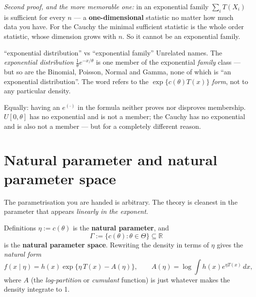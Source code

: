 \documentclass[11pt]{article}
\newcommand{\R}{\mathbb{R}}
\begin{document}
\emph{Second proof, and the more memorable one:} in an exponential family
$\sum_iT(X_i)$ is sufficient for every $n$ --- a \textbf{one-dimensional} statistic no matter
how much data you have. For the Cauchy the minimal sufficient statistic is the whole order
statistic, whose dimension grows with $n$. So it cannot be an exponential family.

\begin{confusion}{``exponential distribution'' vs ``exponential family''}
Unrelated names. The \emph{exponential distribution} $\tfrac1\theta e^{-x/\theta}$ is one
member of the exponential \emph{family} class --- but so are the Binomial, Poisson, Normal and
Gamma, none of which is ``an exponential distribution''. The word refers to the
$\exp\{c(\theta)T(x)\}$ \emph{form}, not to any particular density.

Equally: having an $e^{(\cdot)}$ in the formula neither proves nor disproves membership.
$U[0,\theta]$ has no exponential and is not a member; the Cauchy has no exponential and is
also not a member --- but for a completely different reason.
\end{confusion}

\section{Natural parameter and natural parameter space}

The parametrisation you are handed is arbitrary. The theory is cleanest in the parameter that
appears \emph{linearly in the exponent}.

\begin{idea}{Definitions}
$\eta:=c(\theta)$ is the \textbf{natural parameter}, and
\[
\Gamma:=\{c(\theta):\theta\in\Theta\}\subseteq\R
\]
is the \textbf{natural parameter space}. Rewriting the density in terms of $\eta$ gives the
\emph{natural form}
\[
f(x\mid\eta)=h(x)\exp\{\eta\,T(x)-A(\eta)\},\qquad
A(\eta)=\log\int h(x)e^{\eta T(x)}\,dx ,
\]
where $A$ (the \emph{log-partition} or \emph{cumulant} function) is just whatever makes the
density integrate to 1.
\end{idea}
\end{document}
